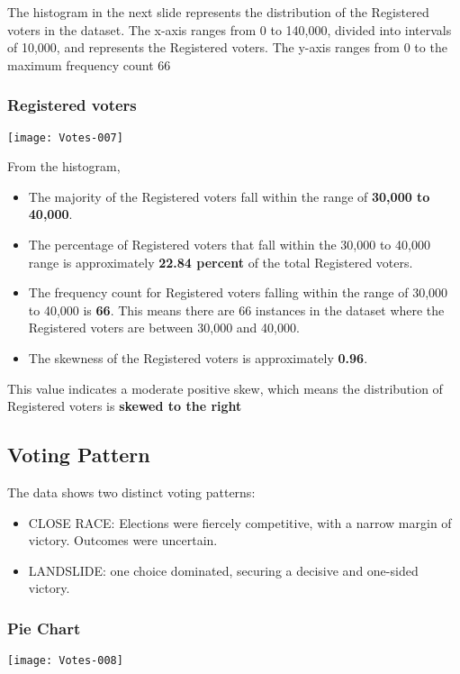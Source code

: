 \documentclass[fleqn,a4paper,12pt]{article}
\begin{document}
The histogram in the next slide represents the distribution of the Registered voters in the dataset. The x-axis ranges from 0 to 140,000, divided into intervals of 10,000, and represents the Registered voters. The y-axis ranges from 0 to the maximum frequency count 66


\subsubsection{Registered voters}
 
\texttt{[image: Votes-007]}


From the histogram, 
\begin{itemize}
\item The majority of the Registered voters fall within the range of \textbf{30,000 to 40,000}.
\item The percentage of Registered voters that fall within the 30,000 to 40,000 range is approximately \textbf{22.84 percent} of the total Registered voters.
\item The frequency count for Registered voters falling within the range of 30,000 to 40,000 is \textbf{66}. This means there are 66 instances in the dataset where the Registered voters are between 30,000 and 40,000.
\item The skewness of the Registered voters is approximately \textbf{0.96}.
\end{itemize}
This value indicates a moderate positive skew, which means the distribution of Registered voters is \textbf{skewed to the right}
 
\subsection{Voting Pattern}

The data shows two distinct voting patterns:

\begin{itemize}
\item CLOSE RACE: Elections were fiercely competitive, with a narrow margin of victory. Outcomes were uncertain.
\item LANDSLIDE: one choice dominated, securing a decisive and one-sided victory.
\end{itemize}

\subsubsection{Pie Chart}

\texttt{[image: Votes-008]}
 
\end{document}
